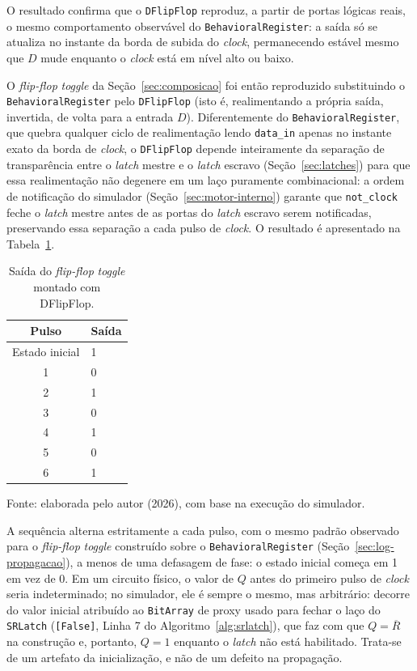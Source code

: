 O resultado confirma que o \texttt{DFlipFlop} reproduz, a partir de portas lógicas reais, o mesmo comportamento observável do \texttt{BehavioralRegister}: a saída só se atualiza no instante da borda de subida do \textit{clock}, permanecendo estável mesmo que $D$ mude enquanto o \textit{clock} está em nível alto ou baixo.

O \textit{flip-flop} \textit{toggle} da Seção~\ref{sec:composicao} foi então reproduzido substituindo o \texttt{BehavioralRegister} pelo \texttt{DFlipFlop} (isto é, realimentando a própria saída, invertida, de volta para a entrada $D$). Diferentemente do \texttt{BehavioralRegister}, que quebra qualquer ciclo de realimentação lendo \texttt{data\_in} apenas no instante exato da borda de \textit{clock}, o \texttt{DFlipFlop} depende inteiramente da separação de transparência entre o \textit{latch} mestre e o \textit{latch} escravo (Seção~\ref{sec:latches}) para que essa realimentação não degenere em um laço puramente combinacional: a ordem de notificação do simulador (Seção~\ref{sec:motor-interno}) garante que \texttt{not\_clock} feche o \textit{latch} mestre antes de as portas do \textit{latch} escravo serem notificadas, preservando essa separação a cada pulso de \textit{clock}. O resultado é apresentado na Tabela~\ref{tab:toggle-dff}.

\begin{table}[H]
\centering
\caption{Saída do \textit{flip-flop} \textit{toggle} montado com DFlipFlop.}
\label{tab:toggle-dff}
\begin{tabular}{c|l}
\hline
\textbf{Pulso} & \textbf{Saída} \\
\hline
Estado inicial & 1 \\
1 & 0 \\
2 & 1 \\
3 & 0 \\
4 & 1 \\
5 & 0 \\
6 & 1 \\
\hline
\end{tabular}
\begin{center}
\footnotesize Fonte: elaborada pelo autor (2026), com base na execução do simulador.
\end{center}
\end{table}

A sequência alterna estritamente a cada pulso, com o mesmo padrão observado para o \textit{flip-flop} \textit{toggle} construído sobre o \texttt{BehavioralRegister} (Seção~\ref{sec:log-propagacao}), a menos de uma defasagem de fase: o estado inicial começa em 1 em vez de 0. Em um circuito físico, o valor de $Q$ antes do primeiro pulso de \textit{clock} seria indeterminado; no simulador, ele é sempre o mesmo, mas arbitrário: decorre do valor inicial atribuído ao \texttt{BitArray} de proxy usado para fechar o laço do \texttt{SRLatch} (\texttt{[False]}, Linha 7 do Algoritmo~\ref{alg:srlatch}), que faz com que $Q = \overline{R}$ na construção e, portanto, $Q = 1$ enquanto o \textit{latch} não está habilitado. Trata-se de um artefato da inicialização, e não de um defeito na propagação.

